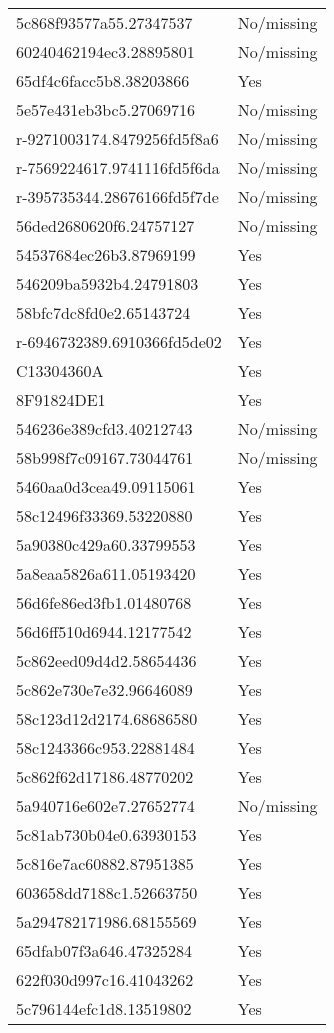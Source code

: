 \begin{tabular}{ll}
5c868f93577a55.27347537 & No/missing \\
60240462194ec3.28895801 & No/missing \\
65df4c6facc5b8.38203866 & Yes \\
5e57e431eb3bc5.27069716 & No/missing \\
r-9271003174.8479256fd5f8a6 & No/missing \\
r-7569224617.9741116fd5f6da & No/missing \\
r-395735344.28676166fd5f7de & No/missing \\
56ded2680620f6.24757127 & No/missing \\
54537684ec26b3.87969199 & Yes \\
546209ba5932b4.24791803 & Yes \\
58bfc7dc8fd0e2.65143724 & Yes \\
r-6946732389.6910366fd5de02 & Yes \\
C13304360A & Yes \\
8F91824DE1 & Yes \\
546236e389cfd3.40212743 & No/missing \\
58b998f7c09167.73044761 & No/missing \\
5460aa0d3cea49.09115061 & Yes \\
58c12496f33369.53220880 & Yes \\
5a90380c429a60.33799553 & Yes \\
5a8eaa5826a611.05193420 & Yes \\
56d6fe86ed3fb1.01480768 & Yes \\
56d6ff510d6944.12177542 & Yes \\
5c862eed09d4d2.58654436 & Yes \\
5c862e730e7e32.96646089 & Yes \\
58c123d12d2174.68686580 & Yes \\
58c1243366c953.22881484 & Yes \\
5c862f62d17186.48770202 & Yes \\
5a940716e602e7.27652774 & No/missing \\
5c81ab730b04e0.63930153 & Yes \\
5c816e7ac60882.87951385 & Yes \\
603658dd7188c1.52663750 & Yes \\
5a294782171986.68155569 & Yes \\
65dfab07f3a646.47325284 & Yes \\
622f030d997c16.41043262 & Yes \\
5c796144efc1d8.13519802 & Yes \\

\end{tabular}
